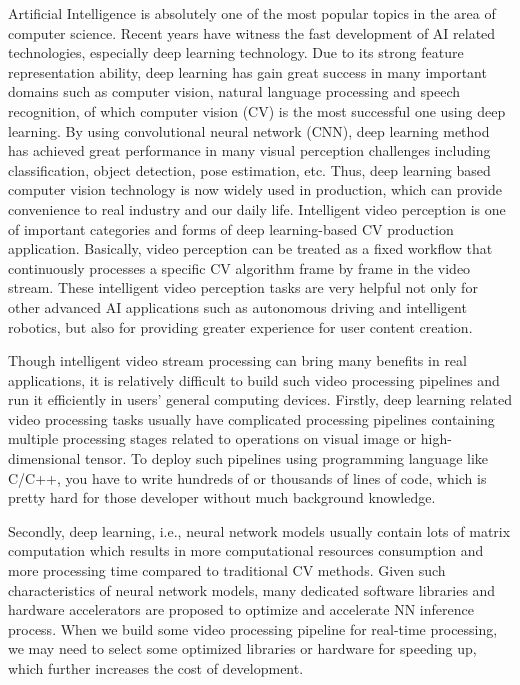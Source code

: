 
\begin{bigabstract}
Artificial Intelligence is absolutely one of the most popular topics in the area of computer science. Recent years have witness the fast development of AI related technologies, especially deep learning technology. Due to its strong feature representation ability, deep learning has gain great success in many important domains such as computer vision, natural language processing and speech recognition, of which computer vision (CV) is the most successful one using deep learning. By using convolutional neural network (CNN), deep learning method has achieved great performance in many visual perception challenges including classification, object detection, pose estimation, etc. Thus, deep learning based computer vision technology is now widely used in production, which can provide convenience to real industry and our daily life. Intelligent video perception is one of important categories and forms of deep learning-based CV production application. Basically, video perception can be treated as a fixed workflow that continuously processes a specific CV algorithm frame by frame in the video stream. These intelligent video perception tasks are very helpful not only for other advanced AI applications such as autonomous driving and intelligent robotics, but also for providing greater experience for user content creation. 

Though intelligent video stream processing can bring many benefits in real applications, it is relatively difficult to build such video processing  pipelines and run it efficiently in users' general computing devices. Firstly, deep learning related video processing tasks usually have complicated processing pipelines containing multiple processing stages related to operations on visual image or high-dimensional tensor. To deploy such pipelines using programming language like C/C++,  you have to write hundreds of or thousands of lines of code, which is pretty hard for those developer without much background knowledge.

Secondly, deep learning, i.e., neural network models usually contain lots of matrix computation which results in more computational resources consumption and more processing time compared to traditional CV methods. Given such characteristics of neural network models, many dedicated software libraries and hardware accelerators are proposed to optimize and accelerate NN inference process. When we build some video processing pipeline for real-time processing, we may need to select some optimized libraries or hardware for speeding up, which further increases the cost of development.


\end{bigabstract}
